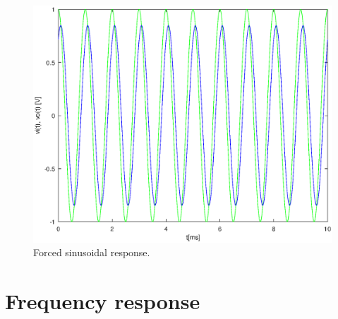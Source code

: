 \lipsum[1-1]


\begin{figure}[h] \centering
\includegraphics[width=0.8\linewidth]{forced.eps}
\caption{Forced sinusoidal response.}
\label{fig:forced}
\end{figure}

\section{Frequency response}

\lipsum[1-1]


